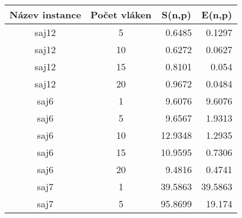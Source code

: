 \documentclass{article} \oddsidemargin=-5mm
\begin{document}
\begin{table}[h]
\centering
\begin{tabular}{|c|c|r|r|}
\hline
\rowcolor[HTML]{C0C0C0} 
\textbf{Název instance} & \textbf{Počet vláken} & \multicolumn{1}{c|}{\cellcolor[HTML]{C0C0C0}\textbf{S(n,p)}} & \multicolumn{1}{c|}{\cellcolor[HTML]{C0C0C0}\textbf{E(n,p)}} \\ \hline
saj12             & 5                  & 0.6485                                                       & 0.1297                                                       \\ \hline
saj12             & 10                 & 0.6272                                                       & 0.0627                                                       \\ \hline
saj12             & 15                 & 0.8101                                                       & 0.054                                                        \\ \hline
saj12             & 20                 & 0.9672                                                       & 0.0484                                                       \\ \hline
saj6              & 1                  & 9.6076                                                       & 9.6076                                                       \\ \hline
saj6              & 5                  & 9.6567                                                       & 1.9313                                                       \\ \hline
saj6              & 10                 & 12.9348                                                      & 1.2935                                                       \\ \hline
saj6              & 15                 & 10.9595                                                      & 0.7306                                                       \\ \hline
saj6              & 20                 & 9.4816                                                       & 0.4741                                                       \\ \hline
saj7              & 1                  & 39.5863                                                      & 39.5863                                                      \\ \hline
saj7              & 5                  & 95.8699                                                      & 19.174                                                       \\ \hline

\end{tabular}
\end{table}
\end{document}
